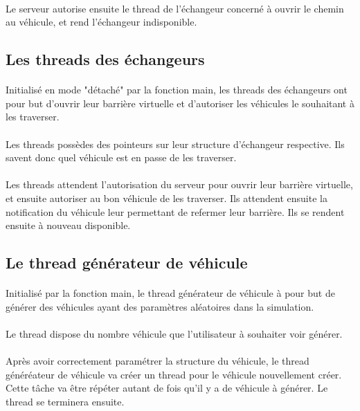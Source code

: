 \documentclass{report}
\begin{document}
	\paragraph{}
	Le serveur autorise ensuite le thread de l'échangeur concerné à ouvrir le chemin au véhicule, et rend l'échangeur indisponible.
	\subsection{Les threads des échangeurs}
	\paragraph{}
	Initialisé en mode "détaché" par la fonction main, les threads des échangeurs ont pour but d'ouvrir leur barrière virtuelle et d'autoriser les véhicules le souhaitant à les traverser.
	\paragraph{}
	Les threads possèdes des pointeurs sur leur structure d'échangeur respective. Ils savent donc quel véhicule est en passe de les traverser.
	\paragraph{}
	Les threads attendent l'autorisation du serveur pour ouvrir leur barrière virtuelle, et ensuite autoriser au bon véhicule de les traverser. Ils attendent ensuite la notification du véhicule leur permettant de refermer leur barrière. Ils se rendent ensuite à nouveau disponible.
	\subsection{Le thread générateur de véhicule}
	\paragraph{}
	Initialisé par la fonction main, le thread générateur de véhicule à pour but de générer des véhicules ayant des paramètres aléatoires dans la simulation.
	\paragraph{}
	Le thread dispose du nombre véhicule que l'utilisateur à souhaiter voir générer.
	\paragraph{}
	Après avoir correctement paramétrer la structure du véhicule, le thread généréateur de véhicule va créer un thread pour le véhicule nouvellement créer. Cette tâche va être répéter autant de fois qu'il y a de véhicule à générer. Le thread se terminera ensuite.
\end{document}
